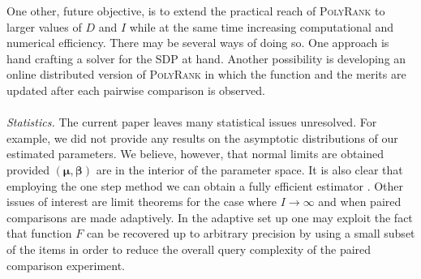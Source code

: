 \documentclass[twoside,11pt]{article}
\begin{document}
One other, future objective, is to extend the practical reach of \textsc{PolyRank} to larger values of $D$ and $I$ while at the same time increasing computational and numerical efficiency. There may be several ways of doing so. One approach is hand crafting a solver for the SDP at hand. Another possibility is developing an online distributed version of \textsc{PolyRank} in which the function and the merits are updated after each pairwise comparison is observed. \\
\\
\textit{Statistics.} The current paper leaves many statistical issues unresolved. For example, we did not provide any results on the asymptotic distributions of our estimated parameters. We believe, however, that normal limits are obtained provided $(\boldsymbol{\mu},\boldsymbol{\beta})$ are in the interior of the parameter space. It is also clear that employing the one step method we can obtain a fully efficient estimator \citep{fan}.  Other issues of interest are limit theorems for the case where $I \to \infty$ and when paired comparisons are made adaptively. In the adaptive set up one may exploit the fact that function $F$ can be recovered up to arbitrary precision by using a small subset of the items in order to reduce the overall query complexity of the paired comparison experiment.




\end{document}
